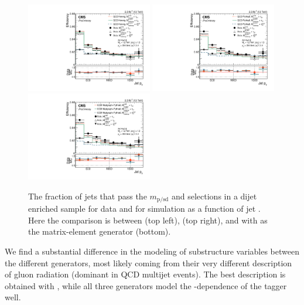 \begin{figure}[h!]
\centering
\includegraphics[width=0.49\textwidth]{figures/vtagging/JME-16-003/BoostedW/BkgEff_DataMC_herwig_pT.pdf}
\includegraphics[width=0.49\textwidth]{figures/vtagging/JME-16-003/BoostedW/BkgEff_DataMC_Pythia8_pT.pdf}\\
\includegraphics[width=0.49\textwidth]{figures/vtagging/JME-16-003/BoostedW/BkgEff_DataMC_Pythia8Madgraph_pT.pdf}
\caption{ 
The fraction of jets that pass the $m_{\mathrm{p/sd}}$ and \nsubj selections in a dijet enriched sample for data and for simulation as a function of jet \PT. Here the comparison is between \HERWIG{++} (top left),  (top right), and  with \MADGRAPH as the matrix-element generator (bottom).}
\label{fig:searchII:fakerate}
\end{figure}
We find a substantial difference in the modeling of substructure variables between the different generators, most likely coming from their very different description of gluon radiation (dominant in QCD multijet events).
The best description is obtained with \HERWIG{++}, while all three generators model the \PT-dependence of the tagger well.\par
